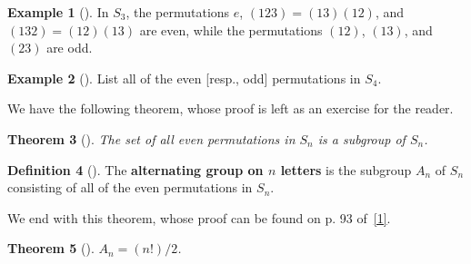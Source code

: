 \documentclass[10pt,]{book}
\newcommand{\terminology}[1]{\textbf{#1}}
\theoremstyle{plain}
\newtheorem{theorem}{Theorem}[section]
\theoremstyle{definition}
\newtheorem{definition}[theorem]{Definition}
\theoremstyle{definition}
\theoremstyle{definition}
\newtheorem{example}[theorem]{Example}
\theoremstyle{definition}
\numberwithin{equation}{section}
\begin{document}
\begin{example}[]\label{example-58}
In \(S_3\), the permutations \(e\), \((123)=(13)(12)\), and \((132)=(12)(13)\) are even, while the permutations \((12)\), \((13)\), and \((23)\) are odd.%
\end{example}
\begin{example}[]\label{example-59}
List all of the even [resp., odd] permutations in \(S_4\).%
\end{example}
We have the following theorem, whose proof is left as an exercise for the reader.%
\begin{theorem}[{}]\label{theorem-36}
The set of all even permutations in \(S_n\) is a subgroup of \(S_n\).%
\end{theorem}
\begin{definition}[{}]\label{definition-51}
The \terminology{alternating group on \(n\) letters} is the subgroup \(A_n\) of \(S_n\) consisting of all of the  even permutations in \(S_n\).%
\end{definition}
We end with this theorem, whose proof can be found on p. 93 of~\hyperlink{F}{[1]}.%
\begin{theorem}[{}]\label{theorem-37}
\(A_n=(n!)/2\).%
\end{theorem}
\typeout{************************************************}
\typeout{************************************************}
\end{document}
